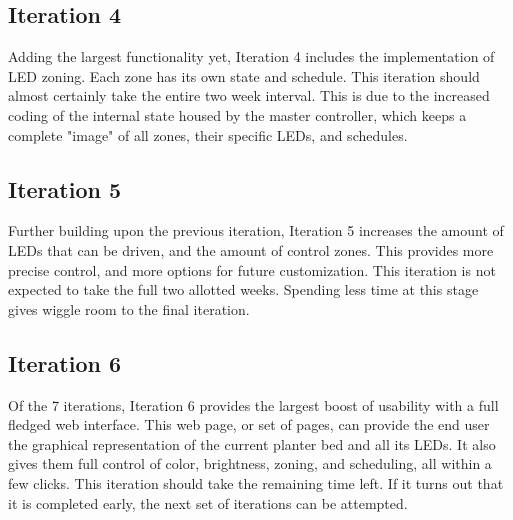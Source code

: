 		\subsection{Iteration 4}
		Adding the largest functionality yet, Iteration 4 includes the implementation of LED zoning. Each zone has its own state and schedule. This iteration
		should almost certainly take the entire two week interval. This is due to the increased coding of the internal state housed by the master controller, which
		keeps a complete "image" of all zones, their specific LEDs, and schedules.

		\subsection{Iteration 5}
		Further building upon the previous iteration, Iteration 5 increases the amount of LEDs that can be driven, and the amount of control zones. This provides
		more precise control, and more options for future customization. This iteration is not expected to take the full two allotted weeks. Spending less time at
		this stage gives wiggle	room to the final iteration.

		\subsection{Iteration 6}
		Of the 7 iterations, Iteration 6 provides the largest boost of usability with a full fledged web interface. This web page, or set of pages, can provide
		the end	user the graphical representation of the current planter bed and all its LEDs. It also gives them full control of color, brightness, zoning,
		and scheduling, all within a few clicks. This iteration should take the remaining time left. If it turns out that it is completed early, the next set of
		iterations can be attempted.

